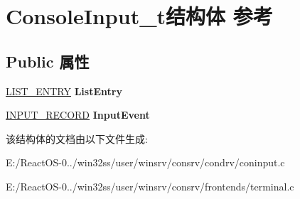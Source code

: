 \hypertarget{struct_console_input__t}{}\section{Console\+Input\+\_\+t结构体 参考}
\label{struct_console_input__t}
\subsection*{Public 属性}
\begin{DoxyCompactItemize}
\item 
\mbox{\label{struct_console_input__t_af93a3ac06a69d22baf9eecbb32ec99e4}} 
\hyperlink{struct___l_i_s_t___e_n_t_r_y}{L\+I\+S\+T\+\_\+\+E\+N\+T\+RY} {\bfseries List\+Entry}
\item 
\mbox{\label{struct_console_input__t_a1fbf1d7745132ddd7a59fc595ac3bad4}} 
\hyperlink{struct___i_n_p_u_t___r_e_c_o_r_d}{I\+N\+P\+U\+T\+\_\+\+R\+E\+C\+O\+RD} {\bfseries Input\+Event}
\end{DoxyCompactItemize}


该结构体的文档由以下文件生成\+:\begin{DoxyCompactItemize}
\item 
E\+:/\+React\+O\+S-\/0../win32ss/user/winsrv/consrv/condrv/coninput.\+c\item 
E\+:/\+React\+O\+S-\/0../win32ss/user/winsrv/consrv/frontends/terminal.\+c\end{DoxyCompactItemize}
